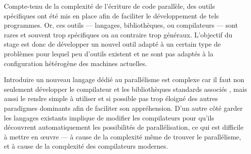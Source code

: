 Compte-tenu de la complexité de l'écriture de code parallèle, des outils spécifiques ont été mis en place afin de faciliter le développement de tels programmes. Or, ces outils --- langages, bibliothèques, ou compilateurs --- sont rares et souvent trop spécifiques ou au contraire trop généraux. L'objectif du stage est donc de développer un nouvel outil adapté à un certain type de problèmes pour lequel peu d'outils existent et ne sont pas adaptés à la configuration hétérogène des machines actuelles.

Introduire un nouveau langage dédié au parallélisme est complexe car il faut non seulement développer le compilateur et les bibliothèques standards associés , mais aussi le rendre simple à utiliser et si possible pas trop éloigné des autres paradigmes dominants afin de faciliter son appréhension. D'un autre côté garder les langages existants implique de modifier les compilateurs pour qu'ils découvrent automatiquement les possibilités de parallélisation, ce qui est difficile à mettre en œuvre --- à cause de la complexité même de trouver le parallélisme, et à cause de la complexité des compilateurs modernes.

